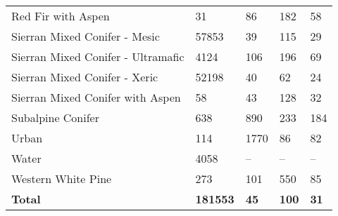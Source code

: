 \begin{table}[!htbp]
\begin{tabular}{@{}lllll@{}}
Red Fir with Aspen     			& 31    	& 86   		& 182  		& 58   \\
Sierran Mixed Conifer - Mesic  	& 57853    	& 39  		& 115  		& 29  \\
Sierran Mixed Conifer - Ultramafic  & 4124  & 106    	& 196     	& 69     \\
Sierran Mixed Conifer - Xeric   & 52198  	& 40 		& 62  		& 24 \\
Sierran Mixed Conifer with Aspen  	& 58  	& 43   		& 128   	& 32   \\
Subalpine Conifer   			& 638  	 	& 890      	& 233   	& 184      \\
Urban 							& 114  		& 1770     	& 86        & 82       \\
Water 							& 4058 		& --       	& --        & --       \\
Western White Pine    			& 273 		& 101    	& 550     	& 85     \\
\textbf{Total}                                                                          & \textbf{181553}    & \textbf{45}                                                                                & \textbf{100}                                                                                & \textbf{31}                                                                                \\ \bottomrule
\end{tabular}
\end{table}